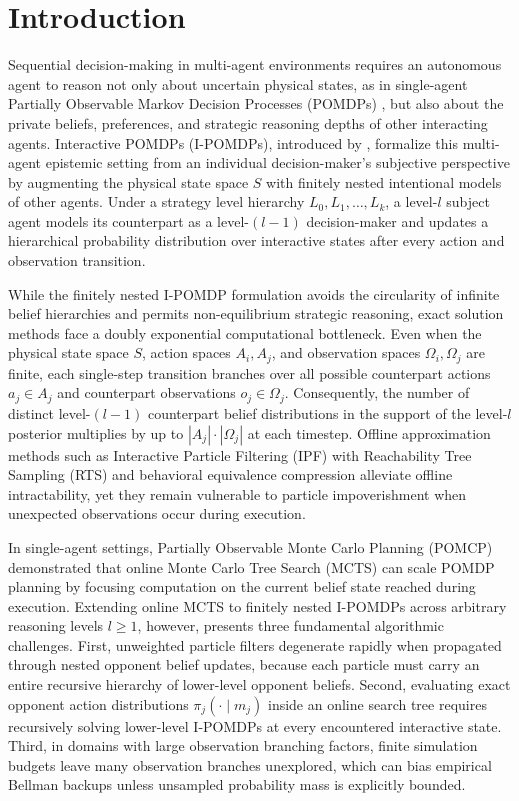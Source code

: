\section{Introduction}
\label{sec:intro}

Sequential decision-making in multi-agent environments requires an autonomous agent to reason not only about uncertain physical states, as in single-agent Partially Observable Markov Decision Processes (POMDPs) \citep{kaelbling1998planning,silver2010monte}, but also about the private beliefs, preferences, and strategic reasoning depths of other interacting agents. Interactive POMDPs (I-POMDPs), introduced by \citet{gmytrasiewicz2005framework}, formalize this multi-agent epistemic setting from an individual decision-maker's subjective perspective by augmenting the physical state space $S$ with finitely nested intentional models of other agents. Under a strategy level hierarchy $L_0, L_1, \dots, L_k$, a level-$l$ subject agent models its counterpart as a level-$(l-1)$ decision-maker and updates a hierarchical probability distribution over interactive states after every action and observation transition.

While the finitely nested I-POMDP formulation avoids the circularity of infinite belief hierarchies and permits non-equilibrium strategic reasoning, exact solution methods face a doubly exponential computational bottleneck. Even when the physical state space $S$, action spaces $A_i, A_j$, and observation spaces $\Omega_i, \Omega_j$ are finite, each single-step transition branches over all possible counterpart actions $a_j \in A_j$ and counterpart observations $o_j \in \Omega_j$. Consequently, the number of distinct level-$(l-1)$ counterpart belief distributions in the support of the level-$l$ posterior multiplies by up to $|A_j| \cdot |\Omega_j|$ at each timestep. Offline approximation methods such as Interactive Particle Filtering (IPF) with Reachability Tree Sampling (RTS) \citep{doshi2009monte} and behavioral equivalence compression \citep{zeng2012exploiting} alleviate offline intractability, yet they remain vulnerable to particle impoverishment when unexpected observations occur during execution.

In single-agent settings, Partially Observable Monte Carlo Planning (POMCP) \citep{silver2010monte} demonstrated that online Monte Carlo Tree Search (MCTS) \citep{kocsis2006bandit} can scale POMDP planning by focusing computation on the current belief state reached during execution. Extending online MCTS to finitely nested I-POMDPs across arbitrary reasoning levels $l \ge 1$, however, presents three fundamental algorithmic challenges. First, unweighted particle filters degenerate rapidly when propagated through nested opponent belief updates, because each particle must carry an entire recursive hierarchy of lower-level opponent beliefs. Second, evaluating exact opponent action distributions $\pi_j(\cdot \mid m_j)$ inside an online search tree requires recursively solving lower-level I-POMDPs at every encountered interactive state. Third, in domains with large observation branching factors, finite simulation budgets leave many observation branches unexplored, which can bias empirical Bellman backups unless unsampled probability mass is explicitly bounded.

